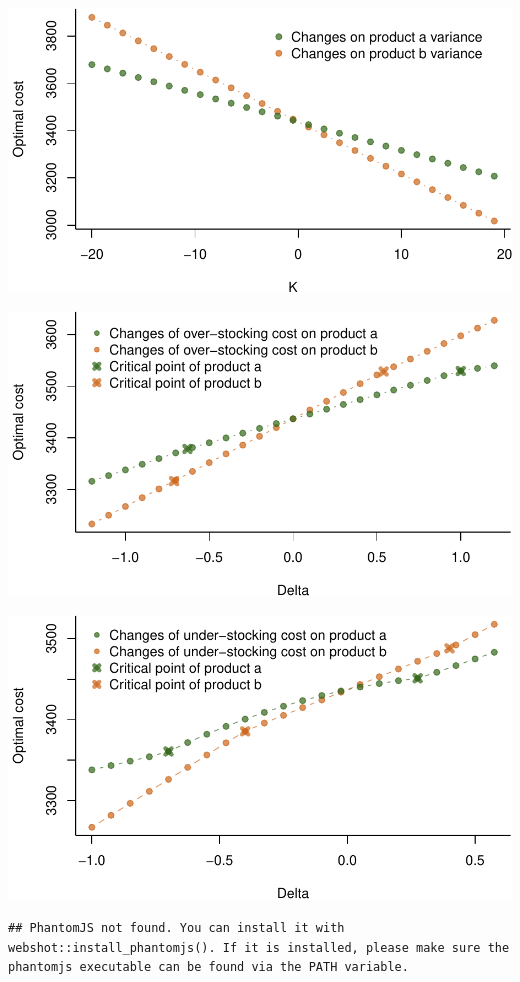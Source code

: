 \documentclass[
]{article}
\begin{document}
\includegraphics{Example-figure_files/figure-latex/var-1.pdf}

\includegraphics{Example-figure_files/figure-latex/c_o-1.pdf}

\includegraphics{Example-figure_files/figure-latex/demandunder-1.pdf}

\begin{verbatim}
## PhantomJS not found. You can install it with webshot::install_phantomjs(). If it is installed, please make sure the phantomjs executable can be found via the PATH variable.
\end{verbatim}
\end{document}
